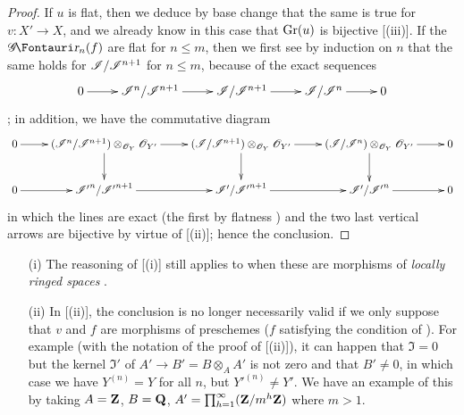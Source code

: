 \begin{proof}
If $u$ is flat, then we deduce by base change that the same is true for $v:X' \to X$, and we already know in this case that $\operatorname{Gr}(u)$ is bijective [(iii)].
If the $\shGr_n(f)$ are flat for $n\leq m$, then we first see by induction on $n$ that the same holds for $\mathscr{I}/\mathscr{I}^{n+1}$ for $n\leq m$, because of the exact sequences
  \[
    \xymatrix{
      0 \ar[r] & \sh{I}^n/\sh{I}^{n+1} \ar[r] & \sh{I}/\sh{I}^{n+1} \ar[r] & \sh{I}/\sh{I}^{n} \ar[r] & 0
    }
  \]
  ;
  in addition, we have the commutative diagram
  \[
    \xymatrix{
      0 \ar[r] & (\sh{I}^n/\sh{I}^{n+1}) \otimes_{\sh{O}_Y}\sh{O}_{Y'} \ar[d]\ar[r] &( \sh{I}/\sh{I}^{n+1}) \otimes_{\sh{O}_Y}\sh{O}_{Y'} \ar[d]\ar[r] & (\sh{I}/\sh{I}^{n}) \otimes_{\sh{O}_Y}\sh{O}_{Y'} \ar[d]\ar[r] & 0 \\
      0 \ar[r] & \sh{I'}^n/\sh{I'}^{n+1} \ar[r] & \sh{I'}/\sh{I'}^{n+1} \ar[r] & \sh{I'}/\sh{I'}^{n} \ar[r] & 0
    }
  \]
  in which the lines are exact (the first by flatness ) and the two last vertical arrows are bijective by virtue of [(ii)];
  hence the conclusion.
\end{proof}

\begin{remarks}[16.2.5]
\label{IV.16.2.5}
\medskip\noindent
\begin{enumerate}
  \item[(i)] The reasoning of [(i)] still applies to  when these are morphisms of \emph{locally ringed spaces} .
  \item[(ii)] In [(ii)], the conclusion is no longer necessarily valid if we only suppose that $v$ and $f$ are morphisms of preschemes ($f$ satisfying the condition of ).
  For example (with the notation of the proof of [(ii)]), it can happen that $\mathfrak{I} = 0$ but the kernel $\mathfrak{I}'$ of $A' \to B' = B \otimes_A A'$ is not zero and that $B' \neq 0$, in which case we have $Y^{(n)} = Y$ for all $n$, but ${Y'}^{(n)} \neq Y'$.
  We have an example of this by taking $A = \mathbf{Z}$, $B = \mathbf{Q}$, $A' = \prod_{h = 1}^\infty (\mathbf{Z}/m^h\mathbf{Z})$ where $m>1$.
\end{enumerate}
\end{remarks}


